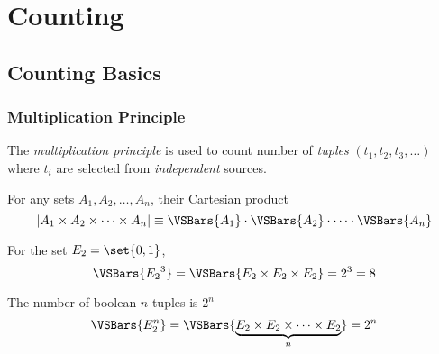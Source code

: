 \chapter{Counting}

\section{Counting Basics}

\subsection{Multiplication Principle}

\begin{definition}
    The \textit{multiplication principle} is used to count number of \textit{tuples} $(t_1, t_2, t_3, \dots)$ where $t_i$ are selected from \textit{independent} sources.
    
    For any sets $A_1, A_2, \dots, A_n$, their Cartesian product
    \begin{equation}
        \lvert A_1 \times A_2 \times \cdots \times A_n \rvert \equiv \VSBars{A_1} \cdot \VSBars{A_2} \cdot \cdots \cdot \VSBars{A_n}
    \end{equation}
\end{definition}

\begin{remark}
    For the set $E_2 = \set{0, 1}$,
    \begin{equation}
        \VSBars{{E_2}^3} = \VSBars{E_2 \times E_2 \times E_2} = 2^3 = 8
    \end{equation}
\end{remark}

\begin{remark}
    The number of boolean $n$-tuples is $2^n$
    \begin{equation}
        \VSBars{E_2^n} = \VSBars{ \underbrace{E_2 \times E_2 \times \cdots \times E_2}_{n} } = 2^n
    \end{equation}
\end{remark}

